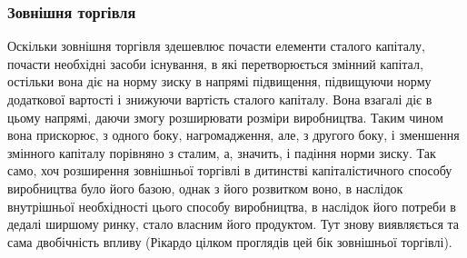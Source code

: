 \subsubsection{Зовнішня торгівля}
Оскільки зовнішня торгівля здешевлює почасти елементи сталого капіталу, почасти необхідні засоби
існування, в які перетворюється змінний капітал, остільки вона діє на норму зиску в напрямі
підвищення, підвищуючи норму додаткової вартості і знижуючи вартість сталого капіталу. Вона взагалі
діє в цьому напрямі, даючи змогу розширювати розміри виробництва. Таким
чином вона прискорює, з одного боку, нагромадження, але, з другого боку, і зменшення змінного
капіталу порівняно з сталим, а, значить, і падіння норми зиску. Так само, хоч розширення зовнішньої
торгівлі в дитинстві капіталістичного способу виробництва було його базою, однак з його розвитком
воно, в наслідок внутрішньої необхідності цього способу виробництва, в наслідок його потреби в
дедалі ширшому ринку, стало власним його продуктом. Тут знову виявляється та сама двобічність впливу
(Рікардо цілком проглядів цей бік зовнішньої торгівлі).
